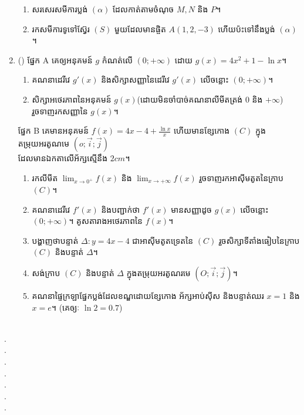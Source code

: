 \documentclass{officialexam}
\begin{document}
\begin{enumerate}[I]
\begin{enumerate}[k]
		\item សរសេរសមីការប្លង់ $\left(\alpha\right)$ ដែលកាត់តាមចំណុច $M,N$ និង $P$។
		\item រកសមីការទូទៅស៊្វែរ $\left(S\right)$ មួយដែលមានផ្ចិត $A\left(1,2,-3\right)$ ហើយប៉ះទៅនឹងប្លង់ $\left(\alpha\right)$។
	\end{enumerate}
	\item {\color{khtug}()} {\color{khtug}\kml ផ្នែក​ \en A} គេឲ្យអនុគមន៍ $g$ កំណត់លើ $\left(0;+\infty\right)$ ដោយ $g(x)=4x^2+1-\ln x$។
	\begin{enumerate}[k]
		\item គណនាដេរីវេ $g'(x)$ និងសិក្សាសញ្ញានៃដេរីវេ $g'(x)$ លើចន្លោះ $\left(0;+\infty\right)$។
		\item សិក្សាអថេរភាពនៃអនុគមន៍ $g(x)$(ដោយមិនចាំបាច់គណនាលីមីតត្រង់ $0$ និង $+\infty$) រួចទាញរកសញ្ញានៃ $g(x)$។
	\end{enumerate}
	{\color{khtug}\kml ផ្នែក​ \en B} គេមានអនុគមន៍ $f(x)=4x-4+\frac{\ln x}{x}$ ហើយមានខ្សែកោង $\left(C\right)$ ក្នុងតម្រុយអរតូណមេ $\left(o;\vec{i};\vec{j}\right)$ \\ដែលមានឯកតាលើអ័ក្សស្មើនឹង $2cm$។
	\begin{enumerate}[k]
		\item រកលីមីត $\lim_{x\to0^{+}}f(x)$ និង $\lim_{x\to+\infty}f(x)$ រួចទាញរកអាសុីមតូតនៃក្រាប $(C)$។
		\item គណនាដេរីវេ $f'(x)$ និងបញ្ជាក់ថា $f'(x)$ មានសញ្ញាដូច $g(x)$ លើចន្លោះ $\left(0;+\infty\right)$។ គូសតារាងអថេរភាពនៃ $f(x)$។
		\item បង្ហាញថាបន្ទាត់ $\Delta: y=4x-4$ ជាអាសុីមតូតទ្រេតនៃ $(C)$ រួចសិក្សាទីតាំងធៀបនៃក្រាប $(C)$ និងបន្ទាត់ $\Delta$។
		\item សង់ក្រាប $(C)$ និងបន្ទាត់ $\Delta$ ក្នុងតម្រុយអរតូណរមេ $\left(O;\vec{i};\vec{j}\right)$។
		\item គណនាផ្ទៃក្រឡាផ្នែកប្លង់ដែលខណ្ឌដោយខ្សែកោង អ័ក្សអាប់សុីស និងបន្ទាត់ឈរ $x=1$ និង $x=e$។ (គេឲ្យៈ $\ln2=0.7$)
	\end{enumerate}
\end{enumerate}
\\
{\color{white}.}\dotfill
\\
{\color{white}.}\dotfill\\
{\color{white}.}\dotfill\\
{\color{white}.}\dotfill
\\
{\color{white}.}\dotfill\\
{\color{white}.}\dotfill\\
{\color{white}.}\dotfill
\\
\end{document}
